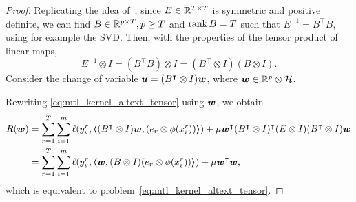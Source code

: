 \begin{proof}
    Replicating the idea of~\cite{EvgeniouMP05}, since ${E} \in \mathbb{R}^{T \times T}$ is symmetric and positive definite, we can find $B \in \mathbb{R}^{p \times T}, p \geq T$ and $\operatorname{rank}{B} = T$ such that $E^{-1} =
            {B^\intercal} {B}$, using for example the SVD.
    Then, with the properties of the tensor product of linear maps,  $$ E^{-1} \otimes I = (B^\intercal B) \otimes I = (B^\intercal \otimes I) (B \otimes I) . $$
    Consider the change of variable $\bm{u} = (B^\intercal \otimes I)\bm{w}$, where $\bm{w} \in \mathbb{R}^p \otimes \mathcal{H}$. %

    Rewriting \eqref{eq:mtl_kernel_altext_tensor} using $\bm{w}$, we obtain
    \begin{equation}
        \nonumber
        \begin{aligned}
            R(\bm{w}) & = \sum_{r=1}^{T} \sum_{i=1}^m \ell(y_i^r, \bm{\left\langle} (B^\intercal \otimes I) \bm{w},  (e_r \otimes \phi(x_i^r)) \bm{\right\rangle}) + \mu  \bm{w}^\intercal (B^\intercal \otimes I)^\intercal (E \otimes I) (B^\intercal \otimes I)\bm{w} \\
                         & = \sum_{r=1}^{T} \sum_{i=1}^m \ell(y_i^r, \bm{\left\langle} \bm{w}, (B \otimes I) (e_r \otimes \phi(x_i^r)) \bm{\right\rangle}) + \mu  \bm{w}^\intercal \bm{w} ,                                                                                 \\
        \end{aligned}
    \end{equation}
    which is equivalent to problem~\eqref{eq:mtl_kernel_altext_tensor}.


\end{proof}
